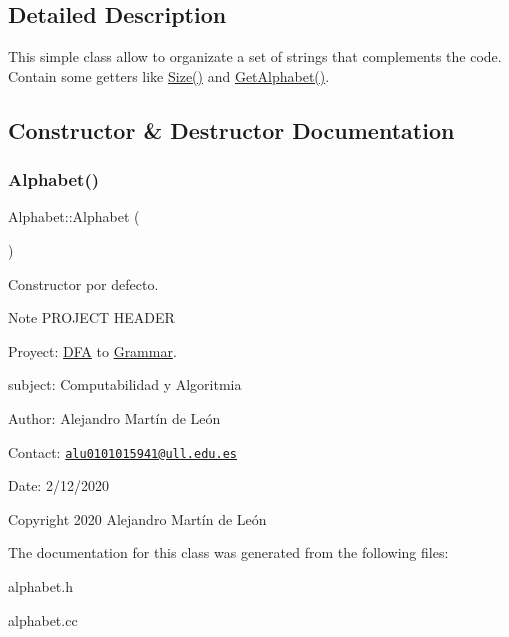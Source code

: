 \subsection{Detailed Description}
This simple class allow to organizate a set of strings that complements the code. Contain some getters like \hyperlink{classAlphabet_a154f45f063a75a8116e8f9022440287e}{Size()} and \hyperlink{classAlphabet_aa27c86b98daa058dc4f299b13c76ee8b}{Get\+Alphabet()}. 

\subsection{Constructor \& Destructor Documentation}
\mbox{\label{classAlphabet_aac9f2f615174ca6c8f89331239cb765e}} 
\subsubsection{\texorpdfstring{Alphabet()}{Alphabet()}}
{\footnotesize\ttfamily Alphabet\+::\+Alphabet (\begin{DoxyParamCaption}{ }\end{DoxyParamCaption})}



Constructor por defecto. 

\begin{DoxyNote}{Note}
P\+R\+O\+J\+E\+CT H\+E\+A\+D\+ER 

Proyect\+: \hyperlink{classDFA}{D\+FA} to \hyperlink{classGrammar}{Grammar}. 

subject\+: Computabilidad y Algoritmia 

Author\+: Alejandro Martín de León 

Contact\+: \href{mailto:alu0101015941@ull.edu.es}{\tt alu0101015941@ull.\+edu.\+es} 

Date\+: 2/12/2020 

Copyright 2020 Alejandro Martín de León 
\end{DoxyNote}


The documentation for this class was generated from the following files\+:\begin{DoxyCompactItemize}
\item 
alphabet.\+h\item 
alphabet.\+cc\end{DoxyCompactItemize}
